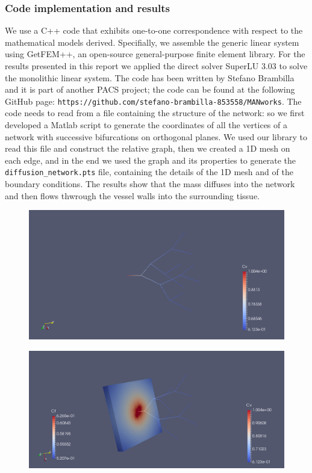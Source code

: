 \documentclass[10pt]{article} %
\begin{document}
	\subsubsection{Code implementation and results}
	We use a C++ code that exhibits one-to-one correspondence with respect to the
	mathematical models derived. Specifially, we assemble the generic linear
	system using GetFEM++, an open-source general-purpose finite element library. For the results presented in this report we applied the direct solver SuperLU 3.03 to solve the monolithic linear system.
	The code has been written by Stefano Brambilla and it is part of another PACS project; the code can be found at the following GitHub page: \texttt{https://github.com/stefano-brambilla-853558/MANworks}.
	\newline\newline
	The code needs to read from a file containing the structure of the network: so we first developed a Matlab script to generate the coordinates of all the vertices of a network with successive bifurcations on orthogonal planes. We used our library to read this file and construct the relative graph, then we created a 1D mesh on each edge, and in the end we used the graph and its properties to generate the \texttt{diffusion\_network.pts} file, containing the details of the 1D mesh and of the boundary conditions.
	\newline
	The results show that the mass diffuses into the network and then flows thwrough the vessel walls into the surrounding tissue.
	
	\begin{figure}[h]
		\centering
		\includegraphics[width=0.92\linewidth]{cv}
		\label{fig:cv}
	\end{figure}
	
	\begin{figure}[!h]
		\centering
		\includegraphics[width=0.92\linewidth]{ct1}
		\label{fig:ct1}
	\end{figure}
	
\end{document}
